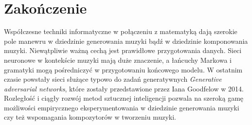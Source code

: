 	\chapter*{Zakończenie}
	Współczesne techniki informatyczne w połączeniu z matematyką dają szerokie pole manewru w dziedzinie generowania muzyki bądź w dziedzinie komponowania muzyki. Niewątpliwie ważną cechą jest prawidłowe przygotowania danych. Sieci neuronowe w kontekście muzyki mają duże znaczenie, a łańcuchy Markowa i gramatyki mogą pośredniczyć w przygotowaniu końcowego modelu. W ostatnim czasie powstały sieci służące typowo do zadań generatywnych \textit{Generative adversarial networks}, które zostały przedstawione przez Iana Goodfelow w 2014. Rozległość i ciągły rozwój metod sztucznej inteligencji pozwala na szeroką gamę możliwości empirycznego eksperymentowania w dziedzinie generowania muzyki czy też wspomagania kompozytorów w tworzeniu muzyki. 